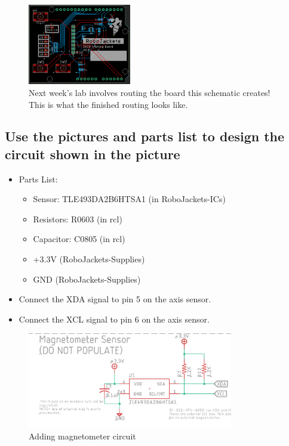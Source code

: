 \documentclass{article}
\begin{document}
\begin{figure}[H]
	\center
	\includegraphics[width=0.4\textwidth, keepaspectratio]{images/board.png}
	\caption{Next week's lab involves routing the board this schematic creates! This is what the finished routing looks like.}
	\label{fig:board}
\end{figure}
\subsection{Use the pictures and parts list to design the circuit shown in the picture}
\begin{itemize}
    \item Parts List:
\begin{itemize}
    \item Sensor: TLE493DA2B6HTSA1 (in RoboJackets-ICs)
    \item Resistors: R0603 (in rcl)
    \item Capacitor: C0805 (in rcl)
    \item +3.3V (RoboJackets-Supplies)
    \item GND (RoboJackets-Supplies)
\end{itemize}
    \item Connect the XDA signal to pin 5 on the axis sensor.
    \item Connect the XCL signal to pin 6 on the axis sensor.
\end{itemize}
\begin{figure}[H]
	\center
	\includegraphics[width=0.8\textwidth, keepaspectratio]{images/5.5.png}
	\caption{Adding magnetometer circuit}
	\label{fig:5.5}
\end{figure}
\end{document}
